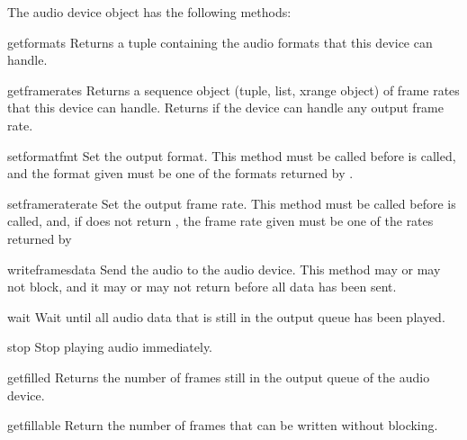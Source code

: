 The audio device object has the following methods:
\renewcommand{\indexsubitem}{(audio device output object methods)}

\begin{funcdesc}{getformats}{}
Returns a tuple containing the audio formats that this device can
handle.
\end{funcdesc}

\begin{funcdesc}{getframerates}{}
Returns a sequence object (tuple, list, xrange object) of frame rates
that this device can handle.  Returns  if the device can
handle any output frame rate.
\end{funcdesc}

\begin{funcdesc}{setformat}{fmt}
Set the output format.  This method must be called before
 is called, and the format given must be one of the
formats returned by .
\end{funcdesc}

\begin{funcdesc}{setframerate}{rate}
Set the output frame rate.  This method must be called before
 is called, and, if  does not return
, the frame rate given must be one of the rates returned by
\end{funcdesc}

\begin{funcdesc}{writeframes}{data}
Send the audio  to the audio device.  This method may or may
not block, and it may or may not return before all data has been sent.
\end{funcdesc}

\begin{funcdesc}{wait}{}
Wait until all audio data that is still in the output queue has been
played.
\end{funcdesc}

\begin{funcdesc}{stop}{}
Stop playing audio immediately.
\end{funcdesc}

\begin{funcdesc}{getfilled}{}
Returns the number of frames still in the output queue of the audio
device.
\end{funcdesc}

\begin{funcdesc}{getfillable}{}
Return the number of frames that can be written without
 blocking.
\end{funcdesc}
